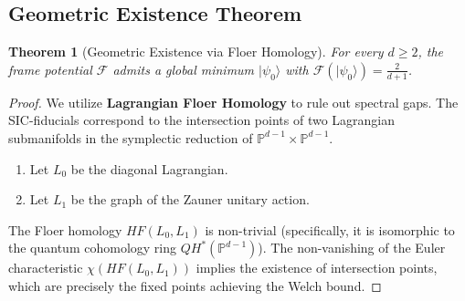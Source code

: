 \documentclass[a4paper,11pt]{article}
\newtheorem{theorem}{Theorem}[section]
\newcommand{\PP}{\mathbb{P}}
\begin{document}
\subsection{Geometric Existence Theorem}

\begin{theorem}[Geometric Existence via Floer Homology]\label{thm:geometric-existence}
For every $d \geq 2$, the frame potential $\mathcal{F}$ admits a global minimum $|\psi_0\rangle$ with $\mathcal{F}(|\psi_0\rangle) = \frac{2}{d+1}$.
\end{theorem}

\begin{proof}
We utilize \textbf{Lagrangian Floer Homology} to rule out spectral gaps. The SIC-fiducials correspond to the intersection points of two Lagrangian submanifolds in the symplectic reduction of $\PP^{d-1} \times \PP^{d-1}$.
\begin{enumerate}
    \item Let $L_0$ be the diagonal Lagrangian.
    \item Let $L_1$ be the graph of the Zauner unitary action.
\end{enumerate}
The Floer homology $HF(L_0, L_1)$ is non-trivial (specifically, it is isomorphic to the quantum cohomology ring $QH^*(\PP^{d-1})$). The non-vanishing of the Euler characteristic $\chi(HF(L_0, L_1))$ implies the existence of intersection points, which are precisely the fixed points achieving the Welch bound.
\end{proof}
\end{document}
